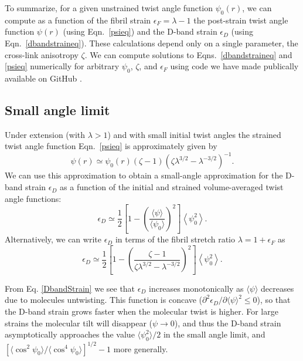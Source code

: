 \documentclass[preprint,12pt]{elsarticle}
\begin{document}
To summarize, for a given unstrained twist angle function $\psi_0(r)$, we can compute as a function of the fibril strain $\epsilon_F = \lambda-1$ the post-strain twist angle function $\psi(r)$ (using Eqn.~\ref{psieq}) and the D-band strain $\epsilon_D$ (using Eqn.~\ref{dbandstraineq}). These calculations depend only on a single parameter, the cross-link anisotropy $\zeta$. We can compute solutions to Eqns.~\ref{dbandstraineq} and \ref{psieq} numerically for arbitrary $\psi_0$, $\zeta$, and $\epsilon_F$ using code we have made publically available on GitHub \cite{github}. 

\subsection{Small angle limit}
Under extension (with $\lambda>1$) and with small initial twist angles the strained twist angle function Eqn.~\ref{psieq} is approximately given by \cite{Leighton:2021b}
\begin{equation}\label{smallangle}
\psi(r) \simeq \psi_0(r) (\zeta-1)\left(\zeta\lambda^{3/2} - \lambda^{-3/2}\right)^{-1}.
\end{equation}
We can use this approximation to obtain a small-angle approximation for the D-band strain $\epsilon_D$ as a function of the initial and strained volume-averaged twist angle functions:
\begin{equation}\label{DbandStrain}
\epsilon_D \simeq \frac{1}{2}\left[ 1 - \left( \frac{\langle \psi\rangle}{\langle\psi_0\rangle}\right)^2\right]\left\langle \psi_0^2\right\rangle.
\end{equation}
Alternatively, we can write $\epsilon_D$
in terms of the fibril stretch ratio $\lambda= 1 + \epsilon_F$ as
\begin{equation}\label{DbandvsFibril}
\epsilon_D \simeq \frac{1}{2}\left[ 1 - \left( \frac{\zeta - 1}{\zeta\lambda^{3/2} - \lambda^{-3/2}}\right)^2\right]\left\langle \psi_0^2\right\rangle.
\end{equation}

From Eq. \ref{DbandStrain} we see that $\epsilon_D$ increases monotonically as $\langle\psi\rangle$ decreases due to molecules untwisting. This function is concave ($\partial^2 \epsilon_D/\partial \langle\psi\rangle^2\leq0$), so that the D-band strain grows faster when the molecular twist is higher. For large strains the molecular tilt will disappear ($\psi\to 0$), and thus the D-band strain asymptotically approaches the value $\langle\psi_0^2\rangle/2$ in the small angle limit, and $\left[\langle\cos^2\psi_0\rangle/\langle\cos^4\psi_0\rangle\right]^{1/2} - 1$ more generally. 
\end{document}
